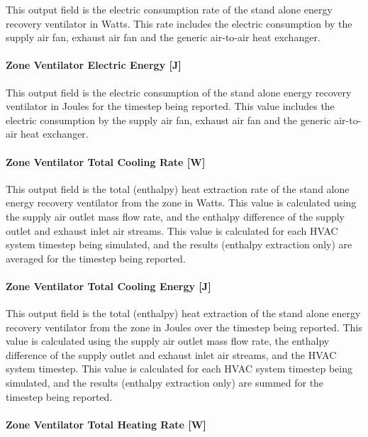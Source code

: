 This output field is the electric consumption rate of the stand alone energy recovery ventilator in Watts. This rate includes the electric consumption by the supply air fan, exhaust air fan and the generic air-to-air heat exchanger.

\paragraph{Zone Ventilator Electric Energy {[}J{]}}\label{zone-ventilator-electric-energy-j}

This output field is the electric consumption of the stand alone energy recovery ventilator in Joules for the timestep being reported. This value includes the electric consumption by the supply air fan, exhaust air fan and the generic air-to-air heat exchanger.

\paragraph{Zone Ventilator Total Cooling Rate {[}W{]}}\label{zone-ventilator-total-cooling-rate-w}

This output field is the total (enthalpy) heat extraction rate of the stand alone energy recovery ventilator from the zone in Watts. This value is calculated using the supply air outlet mass flow rate, and the enthalpy difference of the supply outlet and exhaust inlet air streams. This value is calculated for each HVAC system timestep being simulated, and the results (enthalpy extraction only) are averaged for the timestep being reported.

\paragraph{Zone Ventilator Total Cooling Energy {[}J{]}}\label{zone-ventilator-total-cooling-energy-j}

This output field is the total (enthalpy) heat extraction of the stand alone energy recovery ventilator from the zone in Joules over the timestep being reported. This value is calculated using the supply air outlet mass flow rate, the enthalpy difference of the supply outlet and exhaust inlet air streams, and the HVAC system timestep. This value is calculated for each HVAC system timestep being simulated, and the results (enthalpy extraction only) are summed for the timestep being reported.

\paragraph{Zone Ventilator Total Heating Rate {[}W{]}}\label{zone-ventilator-total-heating-rate-w}

